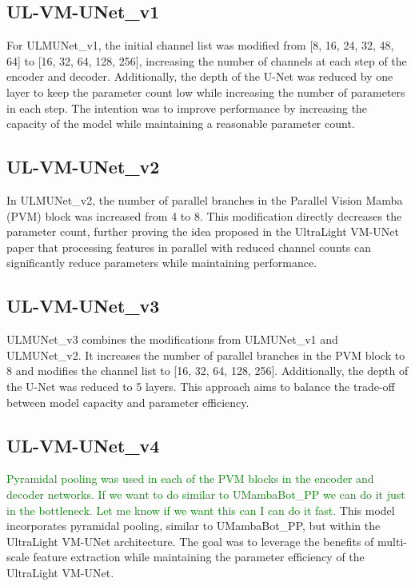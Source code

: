 \documentclass[conference]{IEEEtran}
\newcommand{\gr}[1]{\textcolor{green}{#1}}
\begin{document}
\subsection{UL-VM-UNet\_v1}
For ULMUNet\_v1, the initial channel list was modified from [8, 16, 24, 32, 48, 64] to [16, 32, 64, 128, 256], increasing the number of channels at each step of the encoder and decoder. Additionally, the depth of the U-Net was reduced by one layer to keep the parameter count low while increasing the number of parameters in each step. The intention was to improve performance by increasing the capacity of the model while maintaining a reasonable parameter count.

\subsection{UL-VM-UNet\_v2}
In ULMUNet\_v2, the number of parallel branches in the Parallel Vision Mamba (PVM) block was increased from 4 to 8. This modification directly decreases the parameter count, further proving the idea proposed in the UltraLight VM-UNet paper \cite{ultralightvmunet} that processing features in parallel with reduced channel counts can significantly reduce parameters while maintaining performance.

\subsection{UL-VM-UNet\_v3}
ULMUNet\_v3 combines the modifications from ULMUNet\_v1 and ULMUNet\_v2. It increases the number of parallel branches in the PVM block to 8 and modifies the channel list to [16, 32, 64, 128, 256]. Additionally, the depth of the U-Net was reduced to 5 layers. This approach aims to balance the trade-off between model capacity and parameter efficiency.

\subsection{UL-VM-UNet\_v4}
\gr{Pyramidal pooling was used in each of the PVM blocks in the encoder and decoder networks. If we want to do similar to UMambaBot\_PP we can do it just in the bottleneck. Let me know if we want this can I can do it fast.}
This model incorporates pyramidal pooling, similar to UMambaBot\_PP, but within the UltraLight VM-UNet architecture. The goal was to leverage the benefits of multi-scale feature extraction while maintaining the parameter efficiency of the UltraLight VM-UNet.
\end{document}
